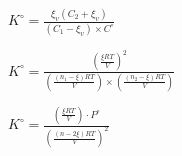 


\begin{enonce}
$K^\circ=\frac{\xi_v\left(C_2+\xi_v\right)}{(C_1-\xi_v)\times C^\circ}$
\end{enonce}






\begin{enonce}
$K^\circ=\frac{\left(\frac{\xi RT}{V}\right)^2}{\left(\frac{(n_1-\xi)RT}{V}\right)\times \left(\frac{(n_2-\xi)RT}{V}\right)}$
\end{enonce}





\begin{enonce}
$K^\circ=\frac{\left(\frac{\xi RT}{V}\right)\cdot P^\circ}{\left(\frac{(n-2\xi)RT}{V}\right)^2}$
\end{enonce}



